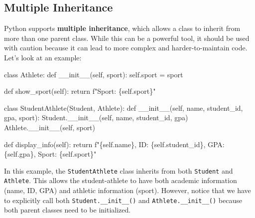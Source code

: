 \documentclass[
  letterpaper,
  DIV=11,
  numbers=noendperiod]{scrreprt}
\newenvironment{Shaded}{\begin{snugshade}}{\end{snugshade}}
\newcommand{\ControlFlowTok}[1]{\textcolor[rgb]{0.00,0.23,0.31}{#1}}
\newcommand{\FunctionTok}[1]{\textcolor[rgb]{0.28,0.35,0.67}{#1}}
\newcommand{\KeywordTok}[1]{\textcolor[rgb]{0.00,0.23,0.31}{#1}}
\newcommand{\NormalTok}[1]{\textcolor[rgb]{0.00,0.23,0.31}{#1}}
\newcommand{\OperatorTok}[1]{\textcolor[rgb]{0.37,0.37,0.37}{#1}}
\newcommand{\SpecialCharTok}[1]{\textcolor[rgb]{0.37,0.37,0.37}{#1}}
\newcommand{\SpecialStringTok}[1]{\textcolor[rgb]{0.13,0.47,0.30}{#1}}
\newcommand{\VariableTok}[1]{\textcolor[rgb]{0.07,0.07,0.07}{#1}}
\begin{document}
\hypertarget{multiple-inheritance}{%
\subsection{Multiple Inheritance}\label{multiple-inheritance}}

Python supports \textbf{multiple inheritance}, which allows a class to
inherit from more than one parent class. While this can be a powerful
tool, it should be used with caution because it can lead to more complex
and harder-to-maintain code. Let's look at an example:

\begin{Shaded}
\begin{Highlighting}[]
\KeywordTok{class}\NormalTok{ Athlete:}
    \KeywordTok{def} \FunctionTok{\_\_init\_\_}\NormalTok{(}\VariableTok{self}\NormalTok{, sport):}
        \VariableTok{self}\NormalTok{.sport }\OperatorTok{=}\NormalTok{ sport}

    \KeywordTok{def}\NormalTok{ show\_sport(}\VariableTok{self}\NormalTok{):}
        \ControlFlowTok{return} \SpecialStringTok{f"Sport: }\SpecialCharTok{\{}\VariableTok{self}\SpecialCharTok{.}\NormalTok{sport}\SpecialCharTok{\}}\SpecialStringTok{"}

\KeywordTok{class}\NormalTok{ StudentAthlete(Student, Athlete):}
    \KeywordTok{def} \FunctionTok{\_\_init\_\_}\NormalTok{(}\VariableTok{self}\NormalTok{, name, student\_id, gpa, sport):}
\NormalTok{        Student.}\FunctionTok{\_\_init\_\_}\NormalTok{(}\VariableTok{self}\NormalTok{, name, student\_id, gpa)}
\NormalTok{        Athlete.}\FunctionTok{\_\_init\_\_}\NormalTok{(}\VariableTok{self}\NormalTok{, sport)}

    \KeywordTok{def}\NormalTok{ display\_info(}\VariableTok{self}\NormalTok{):}
        \ControlFlowTok{return} \SpecialStringTok{f"}\SpecialCharTok{\{}\VariableTok{self}\SpecialCharTok{.}\NormalTok{name}\SpecialCharTok{\}}\SpecialStringTok{, ID: }\SpecialCharTok{\{}\VariableTok{self}\SpecialCharTok{.}\NormalTok{student\_id}\SpecialCharTok{\}}\SpecialStringTok{, GPA: }\SpecialCharTok{\{}\VariableTok{self}\SpecialCharTok{.}\NormalTok{gpa}\SpecialCharTok{\}}\SpecialStringTok{, Sport: }\SpecialCharTok{\{}\VariableTok{self}\SpecialCharTok{.}\NormalTok{sport}\SpecialCharTok{\}}\SpecialStringTok{"}
\end{Highlighting}
\end{Shaded}

In this example, the \texttt{StudentAthlete} class inherits from both
\texttt{Student} and \texttt{Athlete}. This allows the student-athlete
to have both academic information (name, ID, GPA) and athletic
information (sport). However, notice that we have to explicitly call
both \texttt{Student.\_\_init\_\_()} and \texttt{Athlete.\_\_init\_\_()}
because both parent classes need to be initialized.
\end{document}

